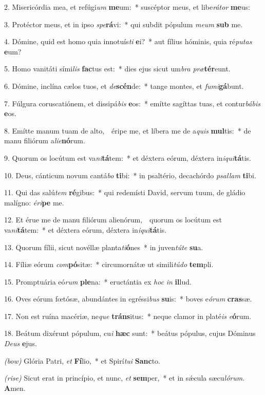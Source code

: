 2. Misericórdia mea, et refúgi\textit{um} \textbf{me}um:~*
	suscéptor meus, et libe\textit{rá}\textit{tor} \textbf{me}us:

3. Protéctor meus, et in ipso \textit{spe}\textbf{rá}vi:~*
	qui subdit pópulum \textit{me}\textit{um} \textbf{sub} me.

4. Dómine, quid est homo quia innotuís\textit{ti} \textbf{e}i?~*
	aut fílius hóminis, quia ré\textit{pu}\textit{tas} \textbf{e}um?

5. Homo vanitáti sími\textit{lis} \textbf{fac}tus est:~*
	dies ejus sicut um\textit{bra} \textit{præ}\textbf{tér}\-eunt.

6. Dómine, inclína cælos tuos, et \textit{de}\textbf{scén}de:~*
	tange montes, et \textit{fu}\textit{mi}\textbf{gá}bunt.

7. Fúlgura coruscatiónem, et dissipá\textit{bis} \textbf{e}os:~*
	emítte sagíttas tuas, et contur\textit{bá}\textit{bis} \textbf{e}os.

8. Emítte manum tuam de alto,~\GreDagger\
	éripe me, et líbera me de a\textit{quis} \textbf{mul}tis:~*
	de manu filiórum a\textit{li}\textit{e}\textbf{nó}rum.

9. Quorum os locútum est va\textit{ni}\textbf{tá}tem:~*
	et déxtera eórum, déxtera in\textit{i}\textit{qui}\textbf{tá}tis.

10. Deus, cánticum novum cantá\textit{bo} \textbf{ti}bi:~*
	in psaltério, decachórdo \textit{psal}\textit{lam} \textbf{ti}bi.

11. Qui das salú\textit{tem} \textbf{ré}gibus:~*
	qui redemísti David, servum tuum, de gládio malígno: \textit{é}\textit{ri}\textbf{pe} me.

12. Et érue me de manu filiórum alienórum,~\GreDagger\
	quorum os locútum est va\textit{ni}\textbf{tá}tem:~*
	et déxtera eórum, déxtera in\textit{i}\textit{qui}\textbf{tá}tis.

13. Quorum fílii, sicut novéllæ planta\textit{ti}\textbf{ó}nes~*
	in juven\textit{tú}\textit{te} \textbf{su}a.

14. Fíliæ eórum \textit{com}\textbf{pó}sitæ:~*
	circumornátæ ut simili\textit{tú}\textit{do} \textbf{tem}pli.

15. Promptuária eó\textit{rum} \textbf{ple}na:~*
	eructántia ex \textit{hoc} \textit{in} \textbf{il}lud.

16. Oves eórum f{\oe}tósæ, abundántes in egréssi\textit{bus} \textbf{su}is:~*
	boves e\textit{ó}\textit{rum} \textbf{cras}sæ.

17. Non est ruína macériæ, ne\textit{que} \textbf{tráns}itus:~*
	neque clamor in platé\textit{is} \textit{e}\textbf{ó}rum.

18. Beátum dixérunt pópulum, cu\textit{i} \textbf{hæc} sunt:~*
	beátus pópulus, cujus Dóminus \textit{De}\textit{us} \textbf{e}jus.

\textit{(bow)} Glória Patri, \textit{et} \textbf{Fí}lio,~*
	et Spirí\textit{tu}\textit{i} \textbf{Sanc}to.

\textit{(rise)} Sicut erat in princípio, et nunc, \textit{et} \textbf{sem}per,~*
	et in s\'{\ae}cula sæcu\textit{ló}\textit{rum}. \textbf{A}men.